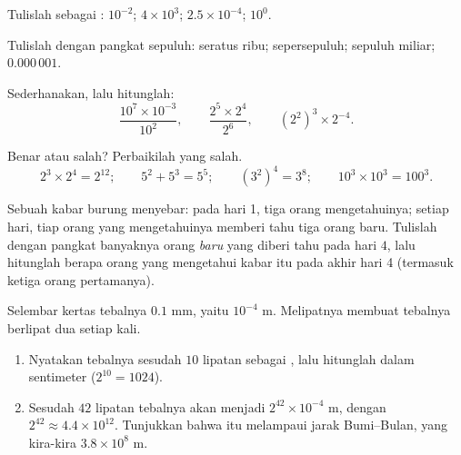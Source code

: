 \begin{exercise}[$\star$]\label{exo:g8:powers:4}
Tulislah sebagai : $10^{-2}$; \quad $4 \times 10^3$; \quad
$2.5 \times 10^{-4}$; \quad $10^0$.
\end{exercise}

\begin{exercise}[$\star$]\label{exo:g8:powers:5}
Tulislah dengan pangkat sepuluh: seratus ribu; sepersepuluh; sepuluh
miliar; $0.000\,001$.
\end{exercise}

\begin{exercise}[$\star$]\label{exo:g8:powers:6}
Sederhanakan, lalu hitunglah:
\[
\frac{10^7 \times 10^{-3}}{10^2},
\qquad
\frac{2^5 \times 2^4}{2^6},
\qquad
\left(2^2\right)^3 \times 2^{-4} .
\]
\end{exercise}

\begin{exercise}[$\star$]\label{exo:g8:powers:7}
Benar atau salah? Perbaikilah yang salah.
\[
2^3 \times 2^4 = 2^{12}; \qquad
5^2 + 5^3 = 5^5; \qquad
(3^2)^4 = 3^8; \qquad
10^3 \times 10^3 = 100^3 .
\]
\end{exercise}

\begin{exercise}[$\star\star$]\label{exo:g8:powers:8}
Sebuah kabar burung menyebar: pada hari 1, tiga orang mengetahuinya;
setiap hari, tiap orang yang mengetahuinya memberi tahu tiga orang
baru. Tulislah dengan pangkat banyaknya orang \emph{baru} yang diberi
tahu pada hari $4$, lalu hitunglah berapa orang yang mengetahui kabar
itu pada akhir hari 4 (termasuk ketiga orang pertamanya).
\end{exercise}

\begin{exercise}[$\star\star$]\label{exo:g8:powers:9}
Selembar kertas tebalnya $0.1$ mm, yaitu $10^{-4}$ m. Melipatnya
membuat tebalnya berlipat dua setiap kali.
\begin{enumerate}
  \item Nyatakan tebalnya sesudah $10$ lipatan sebagai ,
        lalu hitunglah dalam sentimeter ($2^{10} = 1024$).
  \item Sesudah $42$ lipatan tebalnya akan menjadi
        $2^{42} \times 10^{-4}$ m, dengan $2^{42} \approx 4.4 \times
        10^{12}$. Tunjukkan bahwa itu melampaui jarak Bumi--Bulan,
        yang kira-kira $3.8 \times 10^8$ m.
\end{enumerate}
\end{exercise}

